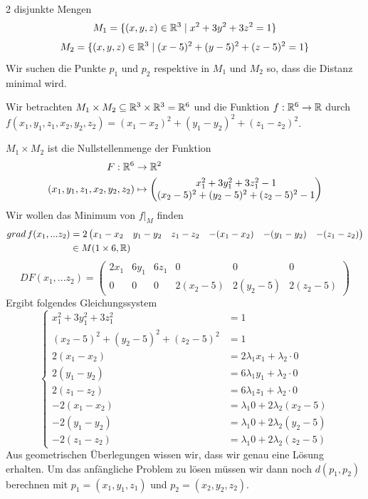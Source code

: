 \documentclass[main.tex]{subfiles}
\begin{document}
\begin{Beispiel}
  2 disjunkte Mengen
  $$M_1 = \{(x,y,z) \in \mathbb{R}^3 \mid x^2 + 3y^2 +3z^2 = 1\}$$
  $$M_2 = \{(x,y,z) \in \mathbb{R}^3 \mid (x - 5)^2 + (y - 5)^2 + (z - 5)^2 = 1\}$$
  Wir suchen die Punkte $p_1$ und $p_2$ respektive in $M_1$ und $M_2$ so, dass die Distanz minimal wird.

  Wir betrachten $M_1 \times M_2 \subseteq \mathbb{R}^3 \times \mathbb{R}^3 = \mathbb{R}^6$ und die Funktion $f: \mathbb{R}^6 \to \mathbb{R}$ durch $f(x_1,y_1,z_1,x_2,y_2,z_2) = (x_1-x_2)^2 + (y_1 - y_2)^2 + (z_1-z_2)^2$.

  $M_1 \times M_2$ ist die Nullstellenmenge der Funktion
  $$\begin{aligned}
    F: \mathbb{R}^6 & \to \mathbb{R}^2 \\
    (x_1,y_1,z_1,x_2,y_2,z_2) & \mapsto \begin{pmatrix}
      x_1^2 + 3y_1^2 + 3 z_1^2 - 1 \\ (x_2 - 5)^2 + (y_2 - 5)^2 + (z_2 - 5)^2 -1
    \end{pmatrix}
  \end{aligned}$$
  Wir wollen das Minimum von $f |_M$ finden
  $$\begin{aligned}
    grad \, f(x_1,...z_2) & = 2 \begin{pmatrix}
    x_1 - x_2 & y_1 - y_2 & z_1 - z_2 & -(x_1 - x_2) & -(y_1 - y_2) & -(z_1 - z_2)
  \end{pmatrix}\\
  & \in M(1 \times 6, \mathbb{R})
  \end{aligned}$$
  $$DF(x_1,...z_2) = \begin{pmatrix}
    2x_1 & 6y_1 & 6z_1 & 0 & 0 & 0 \\
    0 & 0 & 0 & 2(x_2 - 5) & 2(y_2 - 5) & 2(z_2 - 5)
  \end{pmatrix}$$
  Ergibt folgendes Gleichungssystem
  $$\left\{\begin{aligned}
    x_1^2 + 3y_1^2 + 3z_1^2 & = 1 \\
    (x_2 - 5)^2 + (y_2 - 5)^2 + (z_2 - 5)^2 & = 1 \\
    2(x_1 - x_2) & = 2 \lambda_1 x_1 + \lambda_2 \cdot 0 \\
    2(y_1 - y_2) & = 6 \lambda_1 y_1 + \lambda_2 \cdot 0 \\
    2(z_1 - z_2) & = 6 \lambda_1 z_1 + \lambda_2 \cdot 0 \\
    -2(x_1 - x_2) & = \lambda_1 0 + 2 \lambda_2 (x_2 -5) \\
    -2(y_1 - y_2) & = \lambda_1 0 + 2 \lambda_2 (y_2 -5) \\
    -2(z_1 - z_2) & = \lambda_1 0 + 2 \lambda_2 (z_2 -5)
  \end{aligned}\right.$$
  Aus geometrischen Überlegungen wissen wir, dass wir genau eine Lösung erhalten. Um das anfängliche Problem zu lösen müssen wir dann noch $d(p_1,p_2)$ berechnen mit $p_1 = (x_1,y_1,z_1)$ und $p_2 = (x_2,y_2,z_2)$.
\end{Beispiel}
\end{document}

